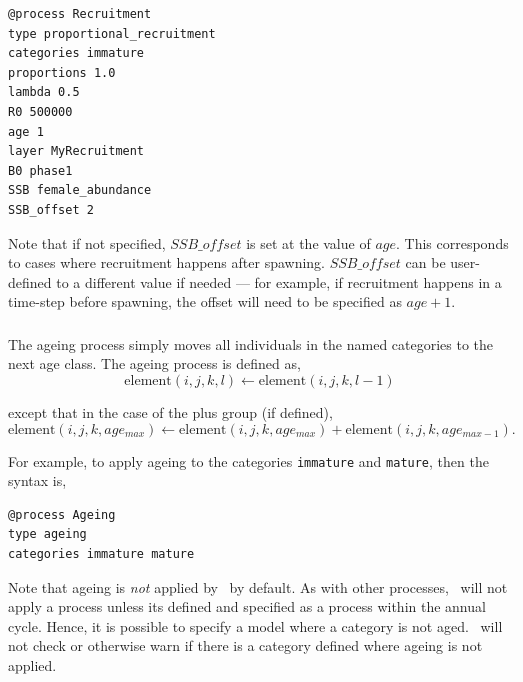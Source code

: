 {\small{\begin{verbatim}
@process Recruitment
type proportional_recruitment
categories immature
proportions 1.0
lambda 0.5
R0 500000
age 1
layer MyRecruitment
B0 phase1
SSB female_abundance
SSB_offset 2
\end{verbatim}}}

Note that if not specified, $SSB\_offset$ is set at the value of $age$. This corresponds to cases where recruitment happens after spawning. $SSB\_offset$ can be user-defined to a different value if needed --- for example, if recruitment happens in a time-step before spawning, the offset will need to be specified as $age + 1$.

\subsubsection{\label{sec:ageing}}

The ageing process simply moves all individuals in the named categories to the next age class. The ageing process is defined as,
\begin{equation}
  \text{element}(i,j,k,l) \leftarrow \text{element}(i,j,k,l-1)
\end{equation}

except that in the case of the plus group (if defined), 
\begin{equation}
  \text{element}(i,j,k,age_{max}) \leftarrow \text{element}(i,j,k,age_{max}) + \text{element}(i,j,k,age_{max-1}).
\end{equation}

For example, to apply ageing to the categories \texttt{immature} and \texttt{mature}, then the syntax is,

{\small{\begin{verbatim}
@process Ageing
type ageing
categories immature mature
\end{verbatim}}}

Note that ageing is \emph{not} applied by \SPM\ by default. As with other processes, \SPM\ will not apply a process unless its defined and specified as a process within the annual cycle. Hence, it is possible to specify a model where a category is not aged. \SPM\ will not check or otherwise warn if there is a category defined where ageing is not applied.

\subsubsection{\label{sec:mortality}}

